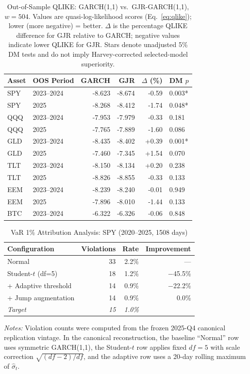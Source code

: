 \begin{table}[H]
\centering
\caption{Out-of-Sample QLIKE: GARCH(1,1) vs.\ GJR-GARCH(1,1), $w = 504$. Values are quasi-log-likelihood scores (Eq.~\eqref{eq:qlike}); lower (more negative) = better. $\Delta$ is the percentage QLIKE difference for GJR relative to GARCH; negative values indicate lower QLIKE for GJR. Stars denote unadjusted 5\% DM tests and do not imply Harvey-corrected selected-model superiority.}
\label{tab:qlike}
\begin{tabular}{llrrrl}
\toprule
Asset & OOS Period & GARCH & GJR & $\Delta$ (\%) & DM $p$ \\
\midrule
SPY & 2023--2024 & -8.623 & -8.674 & -0.59 & 0.003* \\
SPY & 2025 & -8.268 & -8.412 & -1.74 & 0.048* \\
QQQ & 2023--2024 & -7.953 & -7.979 & -0.33 & 0.181 \\
QQQ & 2025 & -7.765 & -7.889 & -1.60 & 0.086 \\
GLD & 2023--2024 & -8.435 & -8.402 & +0.39 & 0.001* \\
GLD & 2025 & -7.460 & -7.345 & +1.54 & 0.070 \\
TLT & 2023--2024 & -8.150 & -8.134 & +0.20 & 0.238 \\
TLT & 2025 & -8.826 & -8.855 & -0.33 & 0.133 \\
EEM & 2023--2024 & -8.239 & -8.240 & -0.01 & 0.949 \\
EEM & 2025 & -7.896 & -8.010 & -1.44 & 0.133 \\
BTC & 2023--2024 & -6.322 & -6.326 & -0.06 & 0.848 \\
\bottomrule
\end{tabular}
\end{table}

\begin{table}[H]
\centering
\caption{VaR 1\% Attribution Analysis: SPY (2020--2025, 1508 days)}
\label{tab:var}
\begin{tabular}{lrrr}
\toprule
Configuration & Violations & Rate & Improvement \\
\midrule
Normal & 33 & 2.2\% & --- \\
Student-$t$ (df=5) & 18 & 1.2\% & $-$45.5\% \\
+ Adaptive threshold & 14 & 0.9\% & $-$22.2\% \\
+ Jump augmentation & 14 & 0.9\% & 0.0\% \\
\midrule
\textit{Target} & \textit{15} & \textit{1.0\%} & \\
\bottomrule
\end{tabular}

{\footnotesize \textit{Notes:} Violation counts were computed from the frozen 2025-Q4 canonical replication vintage. In the canonical reconstruction, the baseline ``Normal'' row uses symmetric GARCH(1,1), the Student-$t$ row applies fixed $df=5$ with scale correction $\sqrt{(df-2)/df}$, and the adaptive row uses a 20-day rolling maximum of $\hat{\sigma}_t$.}
\end{table}

